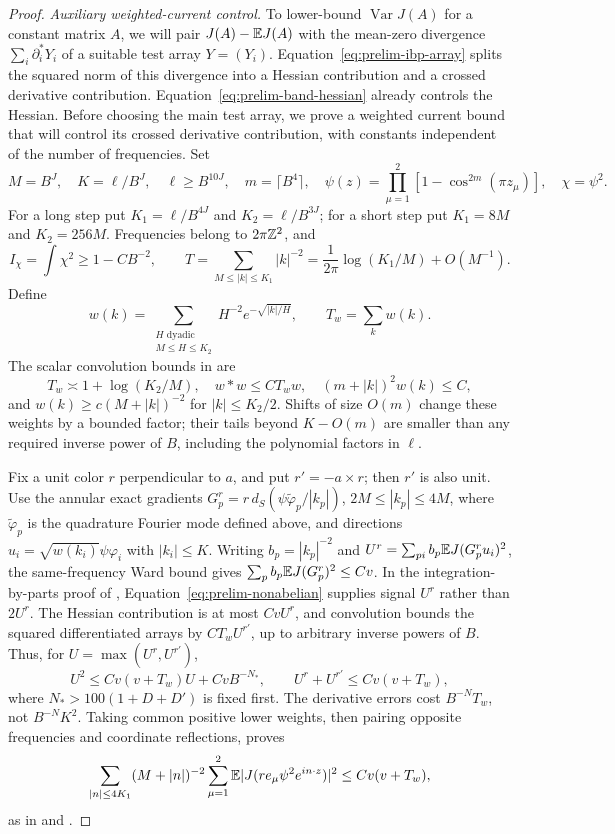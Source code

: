 \begin{proof}
\smallskip\noindent
\emph{Auxiliary weighted-current control.}
To lower-bound $\operatorname{Var}J(A)$ for a constant matrix $A$, we
will pair $J(A)-\mathbb E J(A)$ with the mean-zero divergence
$\sum_i\partial_i^*Y_i$ of a suitable test array $Y=(Y_i)$.
Equation~\eqref{eq:prelim-ibp-array} splits the squared norm of this
divergence into a Hessian contribution and a crossed derivative
contribution. Equation~\eqref{eq:prelim-band-hessian} already controls
the Hessian. Before choosing the main test array, we prove a weighted
current bound that will control its crossed derivative contribution,
with constants independent of the number of frequencies. Set
\[
 M=B^J,\quad K=\ell/B^J,\quad\ell\ge B^{10J},\quad
 m=\lceil B^4\rceil,\quad
 \psi(z)=\prod_{\mu=1}^2[1-\cos^{2m}(\pi z_\mu)],\quad\chi=\psi^2.
\]
For a long step put $K_1=\ell/B^{4J}$ and $K_2=\ell/B^{3J}$; for a
short step put $K_1=8M$ and $K_2=256M$. Frequencies belong to
$2\pi\mathbb Z^2$, and
\[
 I_\chi=\int\chi^2\ge1-CB^{-2},\qquad
 T=\sum_{M\le|k|\le K_1}|k|^{-2}
   =\frac1{2\pi}\log(K_1/M)+O(M^{-1}).
\]
Define
\[
 w(k)=\sum_{\substack{H\text{ dyadic}\\M\le H\le K_2}}
 H^{-2}e^{-\sqrt{|k|/H}},\qquad T_w=\sum_k w(k).
\]
The scalar convolution bounds in  are
\[
 T_w\asymp1+\log(K_2/M),\quad w*w\le CT_ww,\quad
 (m+|k|)^2w(k)\le C,
\]
and $w(k)\ge c(M+|k|)^{-2}$ for $|k|\le K_2/2$.
Shifts of size $O(m)$ change these weights by a bounded factor; their
tails beyond $K-O(m)$ are smaller than any required inverse power of
$B$, including the polynomial factors in $\ell$.

Fix a unit color $r$ perpendicular to $a$, and put $r'=-a\times r$;
then $r'$ is also unit. Use the annular exact
gradients
$G_p^r=r\,d_S(\psi\widetilde\varphi_p/|k_p|)$,
$2M\le|k_p|\le4M$, where $\widetilde\varphi_p$ is the quadrature
Fourier mode defined above, and directions
$u_i=\sqrt{w(k_i)}\psi\varphi_i$ with $|k_i|\le K$.
Writing $b_p=|k_p|^{-2}$ and
$U^r=\sum_{pi}b_p\mathbb E J(G_p^ru_i)^2$, the same-frequency Ward bound gives
$\sum_pb_p\mathbb E J(G_p^r)^2\le Cv$. In the integration-by-parts proof of
, Equation~\eqref{eq:prelim-nonabelian} supplies signal
$U^r$ rather than $2U^r$. The Hessian contribution is at most $CvU^r$,
and convolution bounds the squared differentiated arrays by
$CT_wU^{r'}$, up to arbitrary inverse powers of $B$.
Thus, for $U=\max(U^r,U^{r'})$,
\[
 U^2\le Cv(v+T_w)U+CvB^{-N_*},\qquad
 U^r+U^{r'}\le Cv(v+T_w),
\]
where $N_*>100(1+D+D')$ is fixed first. The derivative errors cost
$B^{-N}T_w$, not $B^{-N}K^2$. Taking common positive lower weights,
then pairing opposite frequencies and coordinate reflections, proves
\begin{equation}
 \sum_{|n|\le4K_1}(M+|n|)^{-2}
 \sum_{\mu=1}^2\mathbb E|J(r e_\mu\psi^2e^{in\cdot z})|^2
 \le Cv(v+T_w),
 \label{eq:prelim-weighted-current}
\end{equation}
as in  and .


\end{proof}

